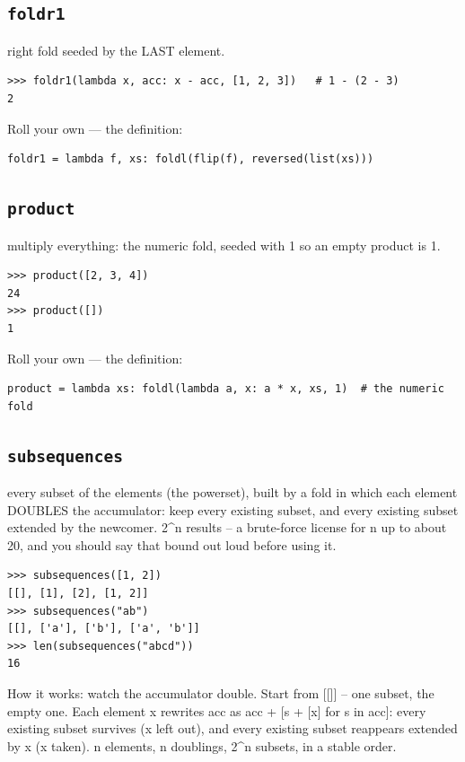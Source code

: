 \documentclass[10pt,letterpaper]{book}
\begin{document}
\subsection{\texttt{foldr1}}\label{def:foldr1}
right fold seeded by the LAST element.
\begin{lstlisting}[style=ex]
>>> foldr1(lambda x, acc: x - acc, [1, 2, 3])   # 1 - (2 - 3)
2
\end{lstlisting}

Roll your own --- the definition:

\begin{lstlisting}[style=ex]
foldr1 = lambda f, xs: foldl(flip(f), reversed(list(xs)))
\end{lstlisting}

\subsection{\texttt{product}}\label{def:product}
multiply everything: the numeric fold, seeded with 1 so an empty product is 1.
\begin{lstlisting}[style=ex]
>>> product([2, 3, 4])
24
>>> product([])
1
\end{lstlisting}

Roll your own --- the definition:

\begin{lstlisting}[style=ex]
product = lambda xs: foldl(lambda a, x: a * x, xs, 1)  # the numeric fold
\end{lstlisting}
\subsection{\texttt{subsequences}}\label{def:subsequences}
every subset of the elements (the powerset), built by a fold in which each element DOUBLES the accumulator: keep every existing subset, and every existing subset extended by the newcomer. 2\^{}n results -- a brute-force license for n up to about 20, and you should say that bound out loud before using it.
\begin{lstlisting}[style=ex]
>>> subsequences([1, 2])
[[], [1], [2], [1, 2]]
>>> subsequences("ab")
[[], ['a'], ['b'], ['a', 'b']]
>>> len(subsequences("abcd"))
16
\end{lstlisting}

How it works: watch the accumulator double. Start from [[]] -- one subset, the empty one. Each element x rewrites acc as acc + [s + [x] for s in acc]: every existing subset survives (x left out), and every existing subset reappears extended by x (x taken). n elements, n doublings, 2\^{}n subsets, in a stable order.
\end{document}
